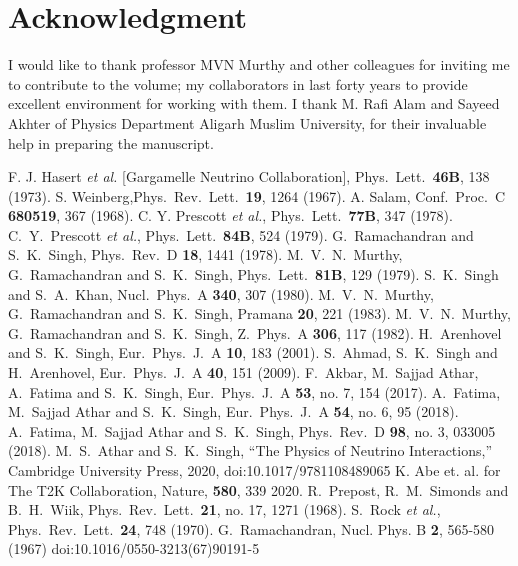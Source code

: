 \section{Acknowledgment}

I would like to thank professor MVN Murthy and other colleagues for inviting me to contribute to the volume; my collaborators in last forty years to provide excellent environment for working with them. I thank M. Rafi Alam and Sayeed Akhter of Physics Department Aligarh Muslim University, for their invaluable help in preparing the manuscript. 

\begin{thebibliography}{99}
 F. J. Hasert {\it et al.} [Gargamelle Neutrino Collaboration], Phys.\ Lett.\  {\bf 46B}, 138 (1973).  
 S. Weinberg,Phys.\ Rev.\ Lett.\  {\bf 19}, 1264 (1967).
 A. Salam,  Conf.\ Proc.\ C {\bf 680519}, 367 (1968).
 C. Y. Prescott {\it et al.}, Phys.\ Lett.\  {\bf 77B}, 347 (1978).
 C.~Y.~Prescott {\it et al.}, Phys.\ Lett.\  {\bf 84B}, 524 (1979).
 G.~Ramachandran and S.~K.~Singh, Phys.\ Rev.\ D {\bf 18}, 1441 (1978).
 M.~V.~N.~Murthy, G.~Ramachandran and S.~K.~Singh, Phys.\ Lett.\  {\bf 81B}, 129 (1979).
 S.~K.~Singh and S.~A.~Khan, Nucl.\ Phys.\ A {\bf 340}, 307 (1980).
 M.~V.~N.~Murthy, G.~Ramachandran and S.~K.~Singh, Pramana {\bf 20}, 221 (1983).
 M.~V.~N.~Murthy, G.~Ramachandran and S.~K.~Singh, Z.\ Phys.\ A {\bf 306}, 117 (1982).
 H.~Arenhovel and S.~K.~Singh, Eur.\ Phys.\ J.\ A {\bf 10}, 183 (2001).
 S.~Ahmad, S.~K.~Singh and H.~Arenhovel, Eur.\ Phys.\ J.\ A {\bf 40}, 151 (2009).
 F.~Akbar, M.~Sajjad Athar, A.~Fatima and S.~K.~Singh, Eur.\ Phys.\ J.\ A {\bf 53}, no. 7, 154 (2017).
 A.~Fatima, M.~Sajjad Athar and S.~K.~Singh, Eur.\ Phys.\ J.\ A {\bf 54}, no. 6, 95 (2018).
 A.~Fatima, M.~Sajjad Athar and S.~K.~Singh, Phys.\ Rev.\ D {\bf 98}, no. 3, 033005 (2018).
 M.~S.~Athar and S.~K.~Singh, ``The Physics of Neutrino Interactions,'' Cambridge University Press, 2020,  doi:10.1017/9781108489065
 K. Abe et. al. for The T2K Collaboration, Nature, {\bf 580}, 339 2020.
 R.~Prepost, R.~M.~Simonds and B.~H.~Wiik, Phys.\ Rev.\ Lett.\  {\bf 21}, no. 17, 1271 (1968).
 S.~Rock {\it et al.}, Phys.\ Rev.\ Lett.\  {\bf 24}, 748 (1970).
 G.~Ramachandran, Nucl. Phys. B \textbf{2}, 565-580 (1967) doi:10.1016/0550-3213(67)90191-5

\end{thebibliography}
